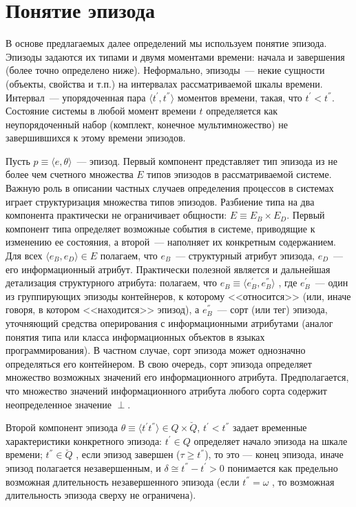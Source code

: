 \section{Понятие эпизода}
В основе предлагаемых далее определений мы используем понятие эпизода. 
Эпизоды задаются их типами и двумя моментами времени: начала и завершения (более точно определено ниже). 
Неформально, эпизоды~--- некие сущности (объекты, свойства и т.п.) на интервалах рассматриваемой шкалы времени. 
Интервал~--- упорядоченная пара $ \langle t^{'},t^{''}\rangle $ моментов времени, такая, что  $ t^{'}<t^{''} $. 
Состояние системы в любой момент времени $ t $ определяется как неупорядоченный набор (комплект, конечное мультимножество) не завершившихся к этому времени эпизодов.

Пусть $ p\equiv \langle e,\theta \rangle $~--- эпизод. 
Первый компонент представляет тип эпизода из не более чем счетного множества  $ E $  типов эпизодов в рассматриваемой системе. 
Важную роль в описании частных случаев определения процессов в системах играет структуризация множества типов эпизодов. 
Разбиение типа на два компонента практически не ограничивает общности: $ E \equiv E_B \times E_D $. 
Первый компонент типа определяет возможные события в системе, приводящие к изменению ее состояния, а второй~--- наполняет их конкретным содержанием. 
Для всех  $ \langle e_B,e_D \rangle \in E $  полагаем, что $ e_B $~--- структурный атрибут эпизода, $ e_D $~--- его информационный атрибут. 
Практически полезной является и дальнейшая детализация структурного атрибута: полагаем, что $ e_B \equiv \langle e_B^{'}, e_B^{''} \rangle $ , где $ e_B^{'} $~--- один из группирующих эпизоды контейнеров, к которому <<относится>> (или, иначе говоря, в котором <<находится>> эпизод), а $ e_B^{''} $~--- сорт (или тег) эпизода, уточняющий средства оперирования с информационными атрибутами (аналог понятия типа или класса информационных объектов в языках программирования). 
В частном случае, сорт эпизода может однозначно определяться его контейнером. 
В свою очередь, сорт эпизода определяет множество возможных значений его информационного атрибута. 
Предполагается, что множество значений информационного атрибута любого сорта содержит неопределенное значение  $ \perp $.

Второй компонент эпизода $ \theta \equiv \langle t^{'} t^{''} \rangle \in Q \times \breve{Q} $, $ t^{'}<t^{''} $ задает временные характеристики конкретного эпизода: $ t^{'}\in Q $  определяет начало эпизода на шкале времени; $ t^{''}\in \breve{Q} $ , если эпизод завершен ($ \tau \geq t^{''} $), то это --- конец эпизода, иначе эпизод полагается незавершенным, и $ \delta \cong t^{''}-t^{'} > 0 $ понимается как предельно возможная длительность незавершенного эпизода (если $ t^{''}=\omega $ , то возможная длительность эпизода сверху не ограничена). 

